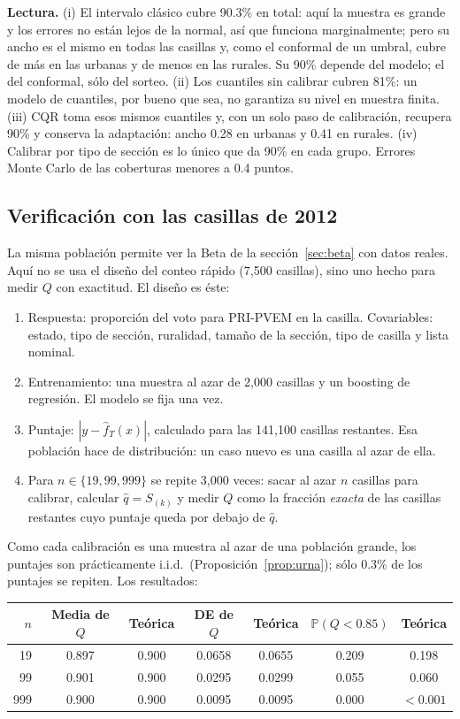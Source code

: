 \documentclass[11pt]{article}
\theoremstyle{plain}
\theoremstyle{definition}
\theoremstyle{remark}
\newcommand{\Prob}{\mathbb P}
\newcommand{\qhat}{\widehat q}
\newcommand{\fhat}{\widehat f_T}
\newcommand{\dest}[1]{\par\needspace{4\baselineskip}\textbf{#1}\quad}
\newcommand{\lamina}[1]{}%
\begin{document}
\dest{Lectura.} (i) El intervalo clásico cubre 90.3\% en total: aquí la muestra es grande y los
errores no están lejos de la normal, así que funciona marginalmente; pero su ancho es el mismo en
todas las casillas y, como el conformal de un umbral, cubre de más en las urbanas y de menos en las
rurales. Su 90\% depende del modelo; el del conformal, sólo del sorteo. (ii) Los cuantiles sin
calibrar cubren 81\%: un modelo de cuantiles, por bueno que sea, no garantiza su nivel en muestra
finita. (iii) CQR toma esos mismos cuantiles y, con un solo paso de calibración, recupera 90\% y
conserva la adaptación: ancho 0.28 en urbanas y 0.41 en rurales. (iv) Calibrar por tipo de sección es
lo único que da 90\% en cada grupo. Errores Monte Carlo de las coberturas menores a 0.4 puntos.

\subsection{Verificación con las casillas de 2012}\label{sec:beta2012}\lamina{29}
La misma población permite ver la Beta de la sección~\ref{sec:beta} con datos reales. Aquí
no se usa el diseño del conteo rápido (7,500 casillas), sino uno hecho para medir $Q$ con
exactitud. El diseño es éste:
\begin{enumerate}
\item Respuesta: proporción del voto para PRI-PVEM en la casilla. Covariables: estado, tipo de
sección, ruralidad, tamaño de la sección, tipo de casilla y lista nominal.
\item Entrenamiento: una muestra al azar de 2,000 casillas y un boosting de regresión. El modelo se
fija una vez.
\item Puntaje: $|y-\fhat(x)|$, calculado para las 141,100 casillas restantes. Esa población hace de
distribución: un caso nuevo es una casilla al azar de ella.
\item Para $n\in\{19,99,999\}$ se repite 3,000 veces: sacar al azar $n$ casillas para calibrar,
calcular $\qhat=S_{(k)}$ y medir $Q$ como la fracción \emph{exacta} de las casillas restantes cuyo
puntaje queda por debajo de $\qhat$.
\end{enumerate}
Como cada calibración es una muestra al azar de una población grande, los puntajes son prácticamente
i.i.d.\ (Proposición~\ref{prop:urna}); sólo 0.3\% de los puntajes se repiten. Los resultados:
\begin{center}
\begin{tabular}{rcccccc}
\toprule
$n$ & Media de $Q$ & Teórica & DE de $Q$ & Teórica & $\Prob(Q<0.85)$ & Teórica\\
\midrule
19 & 0.897 & 0.900 & 0.0658 & 0.0655 & 0.209 & 0.198\\
99 & 0.901 & 0.900 & 0.0295 & 0.0299 & 0.055 & 0.060\\
999 & 0.900 & 0.900 & 0.0095 & 0.0095 & 0.000 & $<0.001$\\
\bottomrule
\end{tabular}
\end{center}
\end{document}
